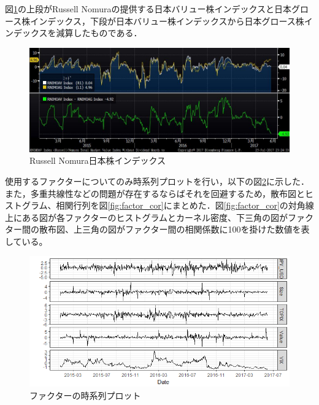 \documentclass[11pt]{jreport}
\begin{document}
図\ref{fig:Value}の上段がRussell Nomuraの提供する日本バリュー株インデックスと日本グロース株インデックス，下段が日本バリュー株インデックスから日本グロース株インデックスを減算したものである．
\begin{figure}[H]
	\begin{center}
		\includegraphics[width=15cm]{./fig/Value.jpg}
		\caption{Russell Nomura日本株インデックス}
		\label{fig:Value}
	\end{center}
\end{figure}

使用するファクターについてのみ時系列プロットを行い，以下の図\ref{fig:factor_plot}に示した．
また，多重共線性などの問題が存在するならばそれを回避するため，散布図とヒストグラム、相関行列を図\ref{fig:factor_cor}にまとめた．図\ref{fig:factor_cor}の対角線上にある図が各ファクターのヒストグラムとカーネル密度、下三角の図がファクター間の散布図、上三角の図がファクター間の相関係数に100を掛けた数値を表している。

\begin{figure}[H]
	\begin{center}
		\includegraphics[width=15cm]{./fig/factor_plot.png}
		\caption{ファクターの時系列プロット}
		\label{fig:factor_plot}
	\end{center}
\end{figure}
\end{document}
